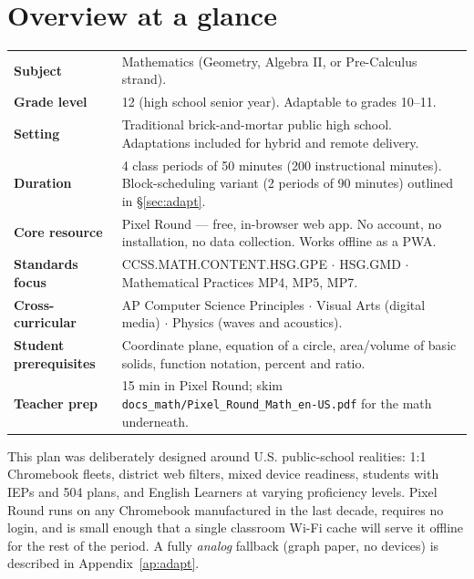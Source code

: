 \documentclass[12pt,letterpaper]{scrartcl}
\begin{document}
\renewcommand{\contentsname}{\color{accent}Contents}
\tableofcontents
\thispagestyle{fancy}
\newpage

\section{Overview at a glance}

\begin{center}
\begin{tabular}{@{}p{}p{}@{}}
\toprule
\textbf{Subject} & Mathematics (Geometry, Algebra II, or Pre-Calculus strand). \\
\addlinespace[2pt]
\textbf{Grade level} & 12 (high school senior year). Adaptable to grades 10--11. \\
\addlinespace[2pt]
\textbf{Setting} & Traditional brick-and-mortar public high school. Adaptations included for hybrid and remote delivery. \\
\addlinespace[2pt]
\textbf{Duration} & 4 class periods of 50 minutes (200 instructional minutes). Block-scheduling variant (2 periods of 90 minutes) outlined in §\ref{sec:adapt}. \\
\addlinespace[2pt]
\textbf{Core resource} & Pixel Round --- free, in-browser web app. No account, no installation, no data collection. Works offline as a PWA. \\
\addlinespace[2pt]
\textbf{Standards focus} & CCSS.MATH.CONTENT.HSG.GPE $\cdot$ HSG.GMD $\cdot$ Mathematical Practices MP4, MP5, MP7. \\
\addlinespace[2pt]
\textbf{Cross-curricular} & AP Computer Science Principles $\cdot$ Visual Arts (digital media) $\cdot$ Physics (waves and acoustics). \\
\addlinespace[2pt]
\textbf{Student prerequisites} & Coordinate plane, equation of a circle, area/volume of basic solids, function notation, percent and ratio. \\
\addlinespace[2pt]
\textbf{Teacher prep} & 15 min in Pixel Round; skim \texttt{docs\_math/Pixel\_Round\_Math\_en-US.pdf} for the math underneath. \\
\bottomrule
\end{tabular}
\end{center}

\begin{note}
This plan was deliberately designed around U.S. public-school realities: 1:1 Chromebook fleets, district web filters, mixed device readiness, students with IEPs and 504 plans, and English Learners at varying proficiency levels. Pixel Round runs on any Chromebook manufactured in the last decade, requires no login, and is small enough that a single classroom Wi-Fi cache will serve it offline for the rest of the period. A fully \emph{analog} fallback (graph paper, no devices) is described in Appendix~\ref{ap:adapt}.
\end{note}
\end{document}
